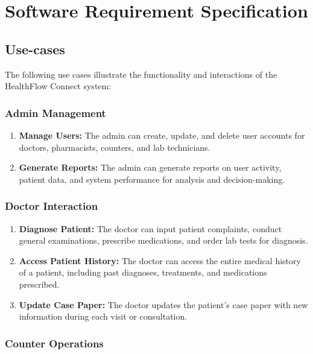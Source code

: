 \chapter{Software Requirement Specification}
\section{Use-cases}

The following use cases illustrate the functionality and interactions of the HealthFlow Connect system:

\subsection{Admin Management}

\begin{enumerate}[label=\textbf{UC\arabic*.}]
  \item \textbf{Manage Users:} The admin can create, update, and delete user accounts for doctors, pharmacists, counters, and lab technicians.
  
  \item \textbf{Generate Reports:} The admin can generate reports on user activity, patient data, and system performance for analysis and decision-making.
\end{enumerate}

\subsection{Doctor Interaction}

\begin{enumerate}[label=\textbf{UC\arabic*.}]
  \item \textbf{Diagnose Patient:} The doctor can input patient complaints, conduct general examinations, prescribe medications, and order lab tests for diagnosis.
  
  \item \textbf{Access Patient History:} The doctor can access the entire medical history of a patient, including past diagnoses, treatments, and medications prescribed.
  
  \item \textbf{Update Case Paper:} The doctor updates the patient's case paper with new information during each visit or consultation.
\end{enumerate}

\subsection{Counter Operations}

